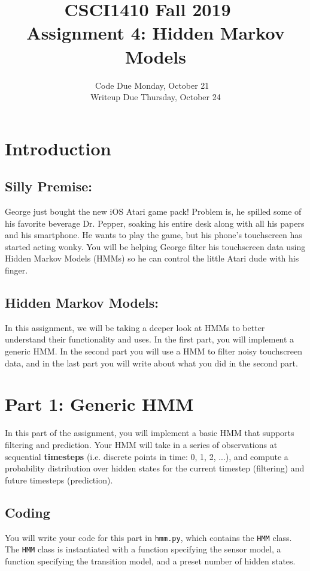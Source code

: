\documentclass{article}
\title{CSCI1410 Fall 2019 ~\\
Assignment 4: Hidden Markov Models}
\date{Code Due Monday, October 21 ~\\
Writeup Due Thursday, October 24}
\begin{document}
    \maketitle

    \section*{Introduction}
    \subsection*{Silly Premise:}

    George just bought the new iOS Atari game pack! Problem is, he spilled some of his favorite beverage Dr. Pepper, soaking his entire desk along with all his papers and his smartphone. He wants to play the game, but his phone's touchscreen has started acting wonky. You will be helping George filter his touchscreen data using Hidden Markov Models (HMMs) so he can control the little Atari dude with his finger.

    \subsection*{Hidden Markov Models:}
    In this assignment, we will be taking a deeper look at HMMs to better understand their functionality and uses. In the first part, you will implement a generic HMM. In the second part you will use a HMM to filter noisy touchscreen data, and in the last part you will write about what you did in the second part.

    \section{Part 1: Generic HMM}
    In this part of the assignment, you will implement a basic HMM that supports filtering and prediction.
    Your HMM will take in a series of observations at sequential \textbf{timesteps} (i.e. discrete points in time: 0, 1, 2, ...), and compute a probability distribution over hidden states for the current timestep (filtering) and future timesteps (prediction).

    \subsection{Coding}
    You will write your code for this part in \verb|hmm.py|, which contains the \verb|HMM| class.
    The \verb|HMM| class is instantiated with a function specifying the sensor model, a function specifying the transition model, and a preset number of hidden states. \\
\end{document}
